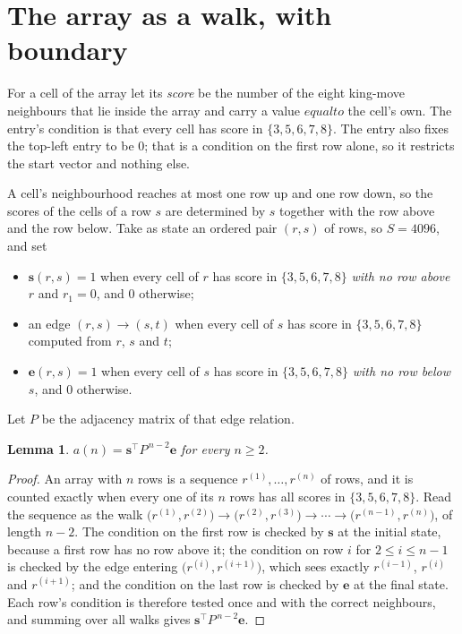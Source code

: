 \documentclass[11pt,a4paper]{article}
\theoremstyle{plain}
\newtheorem{lemma}[theorem]{Lemma}
\theoremstyle{definition}
\begin{document}
\section{The array as a walk, with boundary}

For a cell of the array let its \emph{score} be the number of the eight king-move neighbours that lie inside
the array and carry a value $equal to$ the cell's own. The entry's condition is that every cell
has score in $\{3,5,6,7,8\}$. The entry also fixes the top-left entry to be $0$; that is a condition on the first row alone, so it restricts the start vector and nothing else.

A cell's neighbourhood reaches at most one row up and one row down, so the scores of the
cells of a row $s$ are determined by $s$ together with the row above and the row below.
Take as state an ordered pair $(r,s)$ of rows, so $S=4096$, and set
\begin{itemize}
\item $\mathbf{s}(r,s)=1$ when every cell of $r$ has score in $\{3,5,6,7,8\}$ \emph{with no row
above $r$} and $r_1=0$, and $0$ otherwise;
\item an edge $(r,s)\to(s,t)$ when every cell of $s$ has score in $\{3,5,6,7,8\}$ computed from
$r$, $s$ and $t$;
\item $\mathbf{e}(r,s)=1$ when every cell of $s$ has score in $\{3,5,6,7,8\}$ \emph{with no row
below $s$}, and $0$ otherwise.
\end{itemize}
Let $P$ be the adjacency matrix of that edge relation.

\begin{lemma}\label{lem:walk}
$a(n)=\mathbf{s}^{\!\top}P^{\,n-2}\mathbf{e}$ for every $n\ge2$.
\end{lemma}

\begin{proof}
An array with $n$ rows is a sequence $r^{(1)},\dots,r^{(n)}$ of rows, and it is counted
exactly when every one of its $n$ rows has all scores in $\{3,5,6,7,8\}$. Read the sequence as the
walk $\bigl(r^{(1)},r^{(2)}\bigr)\to\bigl(r^{(2)},r^{(3)}\bigr)\to\cdots\to
\bigl(r^{(n-1)},r^{(n)}\bigr)$, of length $n-2$. The condition on the first row is
checked by $\mathbf{s}$ at the initial state, because a first row has no row above it; the
condition on row $i$ for $2\le i\le n-1$ is checked by the edge entering
$\bigl(r^{(i)},r^{(i+1)}\bigr)$, which sees exactly $r^{(i-1)}$, $r^{(i)}$ and
$r^{(i+1)}$; and the condition on the last row is checked by $\mathbf{e}$ at the final
state. Each row's condition is therefore tested once and with the correct neighbours, and
summing over all walks gives $\mathbf{s}^{\!\top}P^{\,n-2}\mathbf{e}$.
\end{proof}
\end{document}
